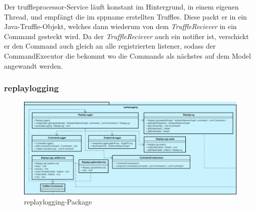     \medskip
    Der truffleprocessor-Service läuft konstant im Hintergrund, in einem eigenen Thread,
    und empfängt die im \gls{sppname} erstellten Truffles.
    Diese packt er in ein Java-Truffle-Objekt, welches dann wiederum von dem
    \textit{TruffleReciever} in ein Command gesteckt wird. Da der \textit{TruffleReciever}
    auch ein \gls{notifier} ist, verschickt er den Command auch gleich an
    alle registrierten \gls{listener}, sodass der CommandExecutor die bekommt wo die Commands
    als nächstes auf dem Model angewandt werden.

    \subsubsection{replaylogging}
    \label{subsubsec:replaylogging}

    \begin{figure}[H]
      \centering
      \includegraphics[width=\textwidth]{../diagramimages/replaylogging.png}
      \caption{replaylogging-Package}
    \end{figure}
    

